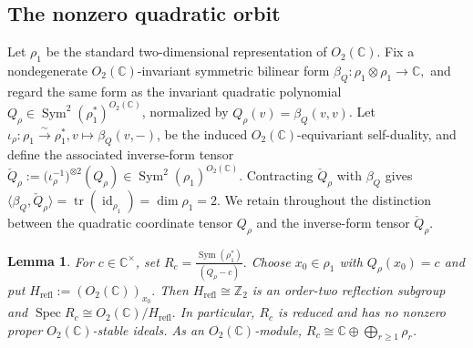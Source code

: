\documentclass[10pt,a4paper]{amsart}
\numberwithin{equation}{section} \newtheorem{thm}{Theorem}[section] \newtheorem{lem}[thm]{Lemma} \newtheorem{ex}[thm]{Example} \newtheorem{prop}[thm]{Proposition} \newtheorem{cor}[thm]{Corollary} \newtheorem{defi}[thm]{Definition} \newtheorem{rmk}[thm]{Remark} \newtheorem{notation}[thm]{Notation}
\newcommand{\id}{\operatorname{id}}
\newcommand{\Sym}{\operatorname{Sym}}
\newcommand{\Spec}{\operatorname{Spec}}
\newcommand{\Otwo}{O_2(\C)}
\def\Z{\mathbb{Z}} \def\N{\mathbb{N}} \def\A{\mathbb{A}} \def\C{\mathbb{C}} \def\R{\mathbb{R}} \def\Q{\mathbb{Q}} \def\F{\mathbb{F}}
\begin{document}
\subsection{The nonzero quadratic orbit}

Let $\rho_1$ be the standard two-dimensional representation of $\Otwo$. Fix a nondegenerate $\Otwo$-invariant symmetric bilinear form $ \beta_Q:\rho_1\otimes\rho_1\longrightarrow\C, $ and regard the same form as the invariant quadratic polynomial \(Q_\rho\in\Sym^2(\rho_1^*)^{\Otwo}\), normalized by \(Q_\rho(v)=\beta_Q(v,v)\). Let \(\iota_\rho:\rho_1\overset{\sim}{\longrightarrow}\rho_1^*, v\longmapsto\beta_Q(v,-)\), be the induced $\Otwo$-equivariant self-duality, and define the associated inverse-form tensor \(\check Q_\rho:= \bigl(\iota_\rho^{-1}\bigr)^{\otimes2}(Q_\rho) \in\Sym^2(\rho_1)^{\Otwo}\). Contracting $\check Q_\rho$ with $\beta_Q$ gives $ \langle\beta_Q,\check Q_\rho\rangle =\operatorname{tr}(\id_{\rho_1}) =\dim\rho_1=2. $ We retain throughout the distinction between the quadratic coordinate tensor $Q_\rho$ and the inverse-form tensor $\check Q_\rho$.

\begin{lem}\label{lem:O2-quadric}
For $c\in\C^\times$, set \(R_c=\frac{\Sym(\rho_1^*)}{(Q_\rho-c)}.\) Choose $x_0\in\rho_1$ with $Q_\rho(x_0)=c$ and put \(H_{\mathrm{refl}}:=(\Otwo)_{x_0}.\) Then $H_{\mathrm{refl}}\cong\Z_2$ is an order-two reflection subgroup and \(\Spec R_c\cong\Otwo/H_{\mathrm{refl}}.\) In particular, $R_c$ is reduced and has no nonzero proper $\Otwo$-stable ideals. As an $\Otwo$-module, \(R_c\cong\C\oplus\bigoplus_{r\ge1}\rho_r\).
\end{lem}
\end{document}
